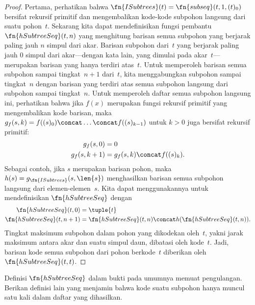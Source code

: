 \documentclass[../../../include/open-logic-section]{subfiles}
\begin{document}
\begin{proof}
  Pertama, perhatikan bahwa
  $\fn{ISubtrees}(t)=\fn{subseq}(t,1,(t)_0)$ bersifat rekursif primitif dan
  mengembalikan kode-kode subpohon langsung dari suatu pohon~$t$. Sekarang
  kita dapat mendefinisikan fungsi pembantu $\fn{hSubtreeSeq}(t,n)$ yang
  menghitung barisan semua subpohon yang berjarak paling jauh $n$ simpul dari
  akar. Barisan subpohon dari~$t$ yang berjarak paling jauh $0$ simpul dari
  akar---dengan kata lain, yang dimulai pada akar~$t$---merupakan barisan yang
  hanya terdiri atas~$t$. Untuk memperoleh barisan semua subpohon sampai
  tingkat~$n+1$ dari~$t$, kita menggabungkan subpohon sampai tingkat~$n$
  dengan barisan yang terdiri atas semua subpohon langsung dari subpohon
  sampai tingkat~$n$. Untuk memperoleh daftar semua subpohon langsung ini,
  perhatikan bahwa jika $f(x)$ merupakan fungsi rekursif primitif yang
  mengembalikan kode barisan, maka
  $g_f(s,k)=f((s)_0)\concat\dots\concat f((s)_{k-1})$ untuk $k>0$ juga
    bersifat rekursif primitif:
    \begin{align*}
      g_f(s,0) & = 0\\
      g_f(s,k+1) & = g_f(s,k) \concat f((s)_k).
    \end{align*}
    Sebagai contoh, jika $s$ merupakan barisan pohon, maka
    $h(s)=g_{\fn{ISubtrees}}(s,\len{s})$ menghasilkan barisan semua subpohon
    langsung dari elemen-elemen~$s$. Kita dapat menggunakannya untuk
    mendefinisikan $\fn{hSubtreeSeq}$ dengan
    \begin{align*}
      \fn{hSubtreeSeq}(t, 0) & = \tuple{t} \\
      \fn{hSubtreeSeq}(t, n+1) & = \fn{hSubtreeSeq}(t, n) \concat
      h(\fn{hSubtreeSeq}(t, n)).
    \end{align*}
    Tingkat maksimum subpohon dalam pohon yang dikodekan oleh~$t$, yakni jarak
    maksimum antara akar dan suatu simpul daun, dibatasi oleh kode~$t$. Jadi,
    barisan kode semua subpohon dari pohon berkode~$t$ diberikan oleh
    $\fn{hSubtreeSeq}(t,t)$.
\end{proof}

\begin{prob}
  Definisi $\fn{hSubtreeSeq}$ dalam bukti
   pada umumnya memuat pengulangan.
  Berikan definisi lain yang menjamin bahwa kode suatu subpohon hanya muncul
  satu kali dalam daftar yang dihasilkan.
\end{prob}
\end{document}
